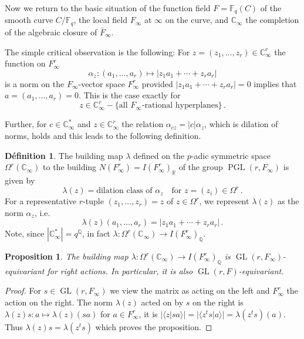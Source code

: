 \documentclass[12pt,a4paper]{article}
\theoremstyle{plain}
\newtheorem{proposition}{Proposition}[section]
\theoremstyle{definition}
\newtheorem{definition}{D\'efinition}[section]
\theoremstyle{remark}
\DeclareMathOperator{\GL}{GL}
\DeclareMathOperator{\PGL}{PGL}
\begin{document}
Now we return to the basic situation of the function field $F = \mathbb{F}_q(C)$ 
of the smooth curve $C/\mathbb{F}_q$, the local field $F_\infty$ at $\infty$ 
on the curve, and $\mathbb{C}_\infty$ the completion of the algebraic closure 
of $\bar{F}_\infty$.

The simple critical observation is the following: For 
$z = (z_1, \ldots, z_r) \in \mathbb{C}_\infty^r$ the function on $F_\infty^r$
\[
\alpha_z\colon (a_1, \ldots, a_r) \longmapsto |z_1 a_1 + \cdots + z_r a_r|
\]
is a norm on the $F_\infty$-vector space $F_\infty^r$ provided 
$|z_1 a_1 + \cdots + z_r a_r| = 0$ implies that $a = (a_1, \ldots, a_r) = 0$. 
This is the case exactly for
\[
z \in \mathbb{C}_\infty^r - \{\text{all $F_\infty$-rational hyperplanes}\} \,.
\]

Further, for $c \in \mathbb{C}_\infty^*$ and $z \in \mathbb{C}_\infty^r$ the relation 
$\alpha_{cz} = |c|\alpha_z$, which is dilation of norms, holds and this 
leads to the following definition.

\begin{definition}
The building map $\lambda$ defined on the $p$-adic symmetric space 
$\Omega^r(\mathbb{C}_\infty)$ to the building $N(F_\infty^r) = I(F_\infty^r)_\mathbb{R}$ 
of the group $\PGL(r, F_\infty)$ is given by
\[
\lambda(z) = \text{dilation class of } \alpha_z \quad\text{for } z = (z_i) \in \Omega^r \,.
\]
For a representative $r$-tuple $(z_1, \ldots, z_r) = z$ of $z \in \Omega^r$, 
we represent $\lambda(z)$ as the norm $\alpha_z$, i.e.
\[
\lambda(z)(a_1, \ldots, a_r) = |z_1 a_1 + \cdots + z_r a_r| \,.
\]
Note, since $|\mathbb{C}_\infty^*| = q^\mathbb{Q}$, in fact 
$\lambda\colon \Omega^r(\mathbb{C}_\infty) \to I(F_\infty^r)_\mathbb{Q}$.
\end{definition}

\begin{proposition}
The building map $\lambda\colon \Omega^r(\mathbb{C}_\infty) \to I(F_\infty^r)_\mathbb{Q}$ 
is $\GL(r, F_\infty)$-equivariant for right actions. In particular, it is 
also $\GL(r,F)$-equivariant.
\end{proposition}

\begin{proof}
For $s \in \GL(r, F_\infty)$ we view the matrix as acting on the left and 
$F_\infty^r$ the action on the right. The norm $\lambda(z)$ acted on by $s$ 
on the right is $\lambda(z)s\colon a \mapsto \lambda(z)(sa)$ for $a \in F_\infty^r$, 
it is $|\langle z|sa\rangle| = |\langle z^t s|a\rangle| = \lambda(z^t s)(a)$. Thus 
$\lambda(z)s = \lambda(z^t s)$ which proves the proposition.
\end{proof}
\end{document}
